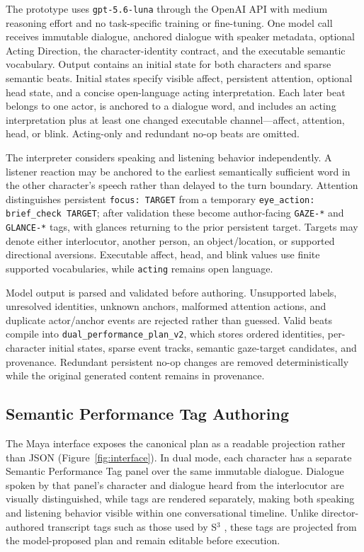 The prototype uses \texttt{gpt-5.6-luna} through the OpenAI API with medium reasoning effort and no task-specific training or fine-tuning. One model call receives immutable dialogue, anchored dialogue with speaker metadata, optional Acting Direction, the character-identity contract, and the executable semantic vocabulary. Output contains an initial state for both characters and sparse semantic beats. Initial states specify visible affect, persistent attention, optional head state, and a concise open-language acting interpretation. Each later beat belongs to one actor, is anchored to a dialogue word, and includes an acting interpretation plus at least one changed executable channel---affect, attention, head, or blink. Acting-only and redundant no-op beats are omitted.

The interpreter considers speaking and listening behavior independently. A listener reaction may be anchored to the earliest semantically sufficient word in the other character's speech rather than delayed to the turn boundary. Attention distinguishes persistent \texttt{focus: TARGET} from a temporary \texttt{eye\_action: brief\_check TARGET}; after validation these become author-facing \texttt{GAZE-*} and \texttt{GLANCE-*} tags, with glances returning to the prior persistent target. Targets may denote either interlocutor, another person, an object/location, or supported directional aversions. Executable affect, head, and blink values use finite supported vocabularies, while \texttt{acting} remains open language.

Model output is parsed and validated before authoring. Unsupported labels, unresolved identities, unknown anchors, malformed attention actions, and duplicate actor/anchor events are rejected rather than guessed. Valid beats compile into \texttt{dual\_performance\_plan\_v2}, which stores ordered identities, per-character initial states, sparse event tracks, semantic gaze-target candidates, and provenance. Redundant persistent no-op changes are removed deterministically while the original generated content remains in provenance.

\subsection{Semantic Performance Tag Authoring}

The Maya interface exposes the canonical plan as a readable projection rather than JSON (Figure~\ref{fig:interface}). In dual mode, each character has a separate Semantic Performance Tag panel over the same immutable dialogue. Dialogue spoken by that panel's character and dialogue heard from the interlocutor are visually distinguished, while tags are rendered separately, making both speaking and listening behavior visible within one conversational timeline. Unlike director-authored transcript tags such as those used by S$^3$ \cite{pan2024s3}, these tags are projected from the model-proposed plan and remain editable before execution.


